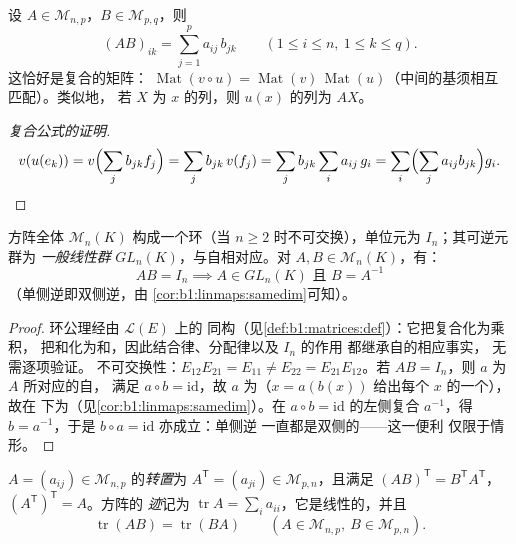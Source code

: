 \begin{definition}[乘积]\label{def:b1:matrices:product}
设 $A \in \mathcal{M}_{n,p}$，$B \in \mathcal{M}_{p,q}$，则
\[
(AB)_{ik} = \sum_{j=1}^{p} a_{ij}\, b_{jk}
\qquad (1 \leq i \leq n,\ 1 \leq k \leq q).
\]
这恰好是复合的矩阵：
$\operatorname{Mat}(v \circ u) = \operatorname{Mat}(v)\,
\operatorname{Mat}(u)$（中间的基须相互匹配）。类似地，
若 $X$ 为 $x$ 的列，则 $u(x)$ 的列为
$AX$。
\end{definition}

\begin{proof}[复合公式的证明]
\[
v(u(e_k)) = v\Bigl(\sum_j b_{jk} f_j\Bigr) = \sum_j b_{jk}\, v(f_j)
= \sum_j b_{jk} \sum_i a_{ij}\, g_i
= \sum_i \Bigl(\sum_j a_{ij} b_{jk}\Bigr) g_i . \qedhere
\]
\end{proof}

\begin{proposition}[代数 $\mathcal{M}_n(K)$]\label{prop:b1:matrices:ring}
方阵全体 $\mathcal{M}_n(K)$ 构成一个环（当 $n
\geq 2$ 时不可交换），单位元为 $I_n$；其可逆元群为
\emph{一般线性群}
$GL_n(K)$，与自相对应。对 $A, B \in
\mathcal{M}_n(K)$，有：
\[
AB = I_n \implies A \in GL_n(K) \text{ 且 } B = A^{-1}
\]
（单侧逆即双侧逆，由
\cref{cor:b1:linmaps:samedim}可知）。
\end{proposition}

\begin{proof}
环公理经由 $\mathcal{L}(E)$ 上的
同构（见\cref{def:b1:matrices:def}）：它把复合化为乘积，
把和化为和，因此结合律、分配律以及 $I_n$ 的作用
都继承自的相应事实，
无需逐项验证。
不可交换性：$E_{12}E_{21} = E_{11} \neq E_{22}
= E_{21}E_{12}$。若 $AB = I_n$，则 $a$ 为 $A$ 所对应的自，
满足 $a \circ b = \mathrm{id}$，故 $a$ 为（$x =
a(b(x))$ 给出每个 $x$ 的一个），故在
下为（见\cref{cor:b1:linmaps:samedim}）。在 $a
\circ b = \mathrm{id}$ 的左侧复合 $a^{-1}$，得 $b =
a^{-1}$，于是 $b\circ a = \mathrm{id}$ 亦成立：单侧逆
一直都是双侧的——这一便利
仅限于情形。
\end{proof}

\begin{definition}[转置；迹]\label{def:b1:matrices:transpose}
$A = (a_{ij}) \in \mathcal{M}_{n,p}$ 的\emph{转置}为 $A^{\mathsf T}
= (a_{ji}) \in \mathcal{M}_{p,n}$，且满足 $(AB)^{\mathsf T} = B^{\mathsf T}
A^{\mathsf T}$，$(A^{\mathsf T})^{\mathsf T} = A$。方阵的
\emph{迹}记为 $\operatorname{tr} A
= \sum_i a_{ii}$，它是线性的，并且
\[
\operatorname{tr}(AB) = \operatorname{tr}(BA)
\qquad (A \in \mathcal{M}_{n,p},\ B \in \mathcal{M}_{p,n}).
\]
\end{definition}


